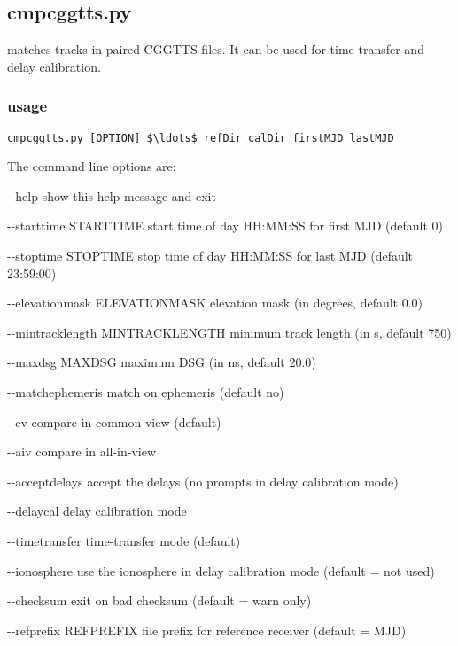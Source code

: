 \subsection{cmpcggtts.py}

 matches tracks in paired CGGTTS files. It can be used for time transfer and delay calibration. 

\subsubsection{usage}

\begin{lstlisting}[mathescape=true]
cmpcggtts.py [OPTION] $\ldots$ refDir calDir firstMJD lastMJD
\end{lstlisting}
The command line options are:
\begin{description*}
 \item[-{}-help]            show this help message and exit
 \item[-{}-starttime STARTTIME] start time of day HH:MM:SS for first MJD (default 0)
 \item[-{}-stoptime STOPTIME]   stop time of day HH:MM:SS for last MJD (default 23:59:00)
 \item[-{}-elevationmask ELEVATIONMASK] elevation mask (in degrees, default 0.0)
 \item[-{}-mintracklength MINTRACKLENGTH] minimum track length (in s, default 750)
 \item[-{}-maxdsg MAXDSG]       maximum DSG (in ns, default 20.0)
 \item[-{}-matchephemeris ]     match on ephemeris (default no)
  \item[-{}-cv]                  compare in common view (default)
  \item[-{}-aiv]                 compare in all-in-view
  \item[-{}-acceptdelays]        accept the delays (no prompts in delay calibration mode)
  \item[-{}-delaycal]            delay calibration mode
  \item[-{}-timetransfer]        time-transfer mode (default)
  \item[-{}-ionosphere]          use the ionosphere in delay calibration mode (default = not used)
   \item[-{}-checksum]           exit on bad checksum (default = warn only)
  \item[-{}-refprefix REFPREFIX] file prefix for reference receiver (default = MJD)

\end{description*}
